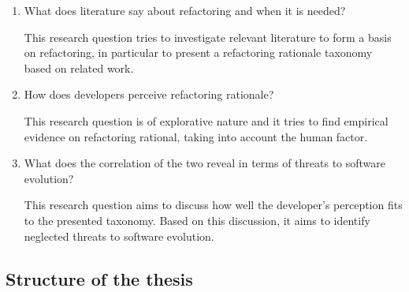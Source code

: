 \begin{enumerate}[label=\textbf{RQ\arabic*}]
\item What does literature say about refactoring and when it is needed?

This research question tries to investigate relevant literature to form a basis on refactoring, in particular to present a refactoring rationale taxonomy based on related work.
\item How does developers perceive refactoring rationale?

This research question is of explorative nature and it tries to find empirical evidence on refactoring rational, taking into account the human factor. 
\item What does the correlation of the two reveal in terms of threats to software evolution?

This research question aims to discuss how well the developer's perception fits to the presented taxonomy. Based on this discussion, it aims to identify neglected threats to software evolution.
\end{enumerate}

\subsection{Structure of the thesis} \label{structure}

